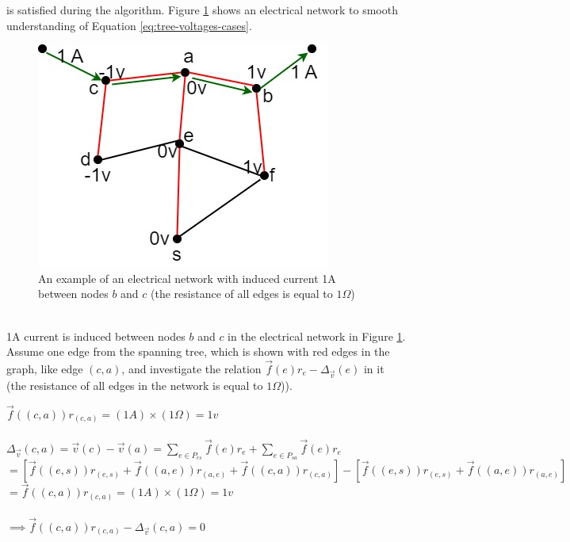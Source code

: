 is satisfied during the algorithm. Figure \ref{fig:voltage-difference} shows an electrical network to smooth understanding of Equation \ref{eq:tree-voltages-cases}.
\begin{figure}[!h]
    \centering
    \includegraphics[scale=0.44]{Images/Convergence/voltage_difference.jpg}
    \caption{An example of an electrical network with induced current 1A between nodes $b$ and $c$ (the resistance of all edges is equal to $1 \Omega$)}
    \label{fig:voltage-difference}
\end{figure} \\
1A current is induced between nodes $b$ and $c$ in the electrical network in Figure \ref{fig:voltage-difference}. Assume one edge from the spanning tree, which is shown with red edges in the graph, like edge $(c,a)$, and investigate the relation $\overrightarrow{f}(e)r_e - \Delta_{\overrightarrow{v}}(e)$ in it (the resistance of all edges in the network is equal to $1 \Omega$)). 
\begin{center}
    $\overrightarrow{f}((c,a))r_{(c,a)} = (1 A) \times (1 \Omega)=1v$\\
    ~\\
    $\Delta_{\overrightarrow{v}}(c,a)=\overrightarrow{v}(c) - \overrightarrow{v} (a) = \sum_{e \in P_{cs}} \overrightarrow{f}(e) r_e + \sum_{e \in P_{sa}} \overrightarrow{f}(e) r_e $\\
    $= [\overrightarrow{f}((e,s))r_{(e,s)} + \overrightarrow{f}((a,e))r_{(a,e)} + \overrightarrow{f}((c,a))r_{(c,a)}]-[\overrightarrow{f}((e,s))r_{(e,s)} + \overrightarrow{f}((a,e))r_{(a,e)}]$\\
    $=\overrightarrow{f}((c,a))r_{(c,a)}=(1 A) \times (1 \Omega)=1v$\\
    ~\\
    $\implies \overrightarrow{f}((c,a))r_{(c,a)} - \Delta_{\overrightarrow{v}}(c,a)=0$
\end{center}
